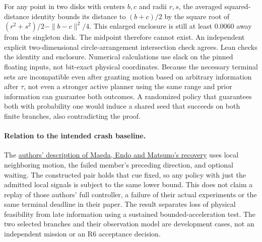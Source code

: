 \documentclass{article}
\begin{document}
For any point in two disks with centers $b,c$ and radii $r,s$,
the averaged squared-distance identity bounds its distance to
$(b+c)/2$ by the square root of
$(r^2+s^2)/2-\|b-c\|^2/4$. This enlarged enclosure is still at
least $0.0060$ away from the singleton disk. The midpoint
therefore cannot exist. An independent explicit two-dimensional
circle-arrangement intersection check agrees. Lean checks the
identity and enclosure. Numerical calculations use slack on
the pinned floating inputs, not bit-exact physical coordinates.
Because the necessary terminal sets are incompatible even after
granting motion based on arbitrary information after $\tau$,
not even a stronger active planner using the same range and
prior information can guarantee both outcomes. A randomized
policy that guarantees both with probability one would induce
a shared seed that succeeds on both finite branches, also
contradicting the proof.

\paragraph{Relation to the intended crash baseline.}
The \href{https://en.endo-lab.jp/research/detail/499}{authors'
description of Maeda, Endo and Matsuno's recovery}
uses local neighboring motion, the failed member's preceding
direction, and optional waiting. The constructed pair holds
that cue fixed, so any policy with just the admitted local
signals is subject to the same lower bound. This does not claim
a replay of those authors' full controller, a failure of their
actual experiments or the same terminal deadline in their
paper. The result separates loss of physical feasibility from
late information using a sustained bounded-acceleration test.
The two selected branches and their observation model are
development cases, not an independent mission or an R6
acceptance decision.
\end{document}

